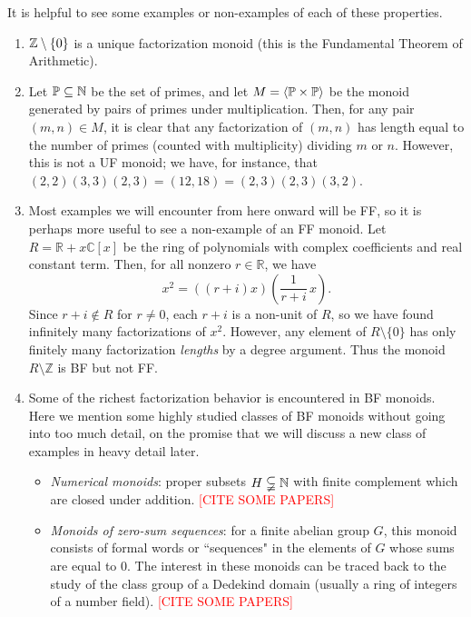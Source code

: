 \begin{eg}
It is helpful to see some examples or non-examples of each of these properties.
\begin{enumerate}[label={\rm (\roman{*})}]
\item $\mathbb{Z}\setminus \{0\}$ is a unique factorization monoid (this is the Fundamental Theorem of Arithmetic).
\item Let $\mathbb{P} \subseteq \mathbb{N}$ be the set of primes, and let $M = \langle \mathbb{P}\times \mathbb{P} \rangle$ be the monoid generated by pairs of primes under multiplication.  
Then, for any pair $(m,n)\in M$, it is clear that any factorization of $(m,n)$ has length equal to the number of primes (counted with multiplicity) dividing $m$ or $n$.
However, this is not a UF monoid; we have, for instance, that $(2,2)(3,3)(2,3) = (12,18) = (2,3)(2,3)(3,2)$.
\item Most examples we will encounter from here onward will be FF, so it is perhaps more useful to see a non-example of an FF monoid.
Let $R = \mathbb{R} + x \mathbb{C}[x]$ be the ring of polynomials with complex coefficients and real constant term.
Then, for all nonzero $r\in \mathbb{R}$, we have
\[ x^2 = ((r+i)x)\left(\frac{1}{r+i}\,x\right). \]
Since $r+i\notin R$ for $r\neq0$, each $r+i$ is a non-unit of $R$, so we have found infinitely many factorizations of $x^2$.
However, any element of $R\setminus \{0\}$ has only finitely many factorization \textit{lengths} by a degree argument.
Thus the monoid $R\setminus \mathbb{Z}$ is BF but not FF.
\item Some of the richest factorization behavior is encountered in BF monoids.  
Here we mention some highly studied classes of BF monoids without going into too much detail, on the promise that we will discuss a new class of examples in heavy detail later.
\begin{itemize}
\item \textit{Numerical monoids}: proper subsets $H \subsetneqq \mathbb{N}$ with finite complement which are closed under addition. \textcolor{red}{[CITE SOME PAPERS]}
\item \textit{Monoids of zero-sum sequences}: for a finite abelian group $G$, this monoid consists of formal words or ``sequences" in the elements of $G$ whose sums are equal to $0$.  
The interest in these monoids can be traced back to the study of the class group of a Dedekind domain (usually a ring of integers of a number field).  \textcolor{red}{[CITE SOME PAPERS]}


\end{itemize}
\end{enumerate}
\end{eg}
